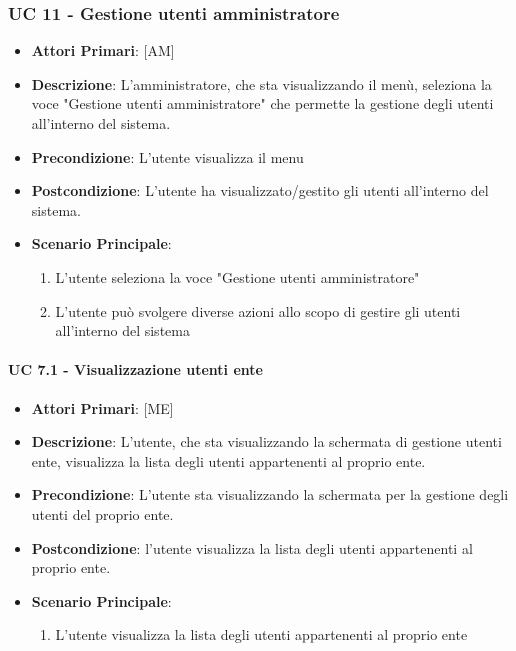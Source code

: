 		\subsubsection{UC 11 - Gestione utenti amministratore}
		\begin{itemize}
			\item \textbf{Attori Primari}: [AM]
			\item \textbf{Descrizione}: L'amministratore, che sta visualizzando il menù, seleziona la voce "Gestione utenti amministratore" che permette la gestione degli utenti all'interno del sistema.
			\item \textbf{Precondizione}: L'utente visualizza il menu
			\item \textbf{Postcondizione}: L'utente ha visualizzato/gestito gli utenti all'interno del sistema. 
			\item \textbf{Scenario Principale}:
			\begin{enumerate}
				\item{L'utente seleziona la voce "Gestione utenti amministratore"}
				\item{L'utente può svolgere diverse azioni allo scopo di gestire gli utenti all'interno del sistema}
			\end{enumerate}	
		\end{itemize}

			\paragraph{UC 7.1 - Visualizzazione utenti ente}
			\begin{itemize}
				\item \textbf{Attori Primari}: [ME]
				\item \textbf{Descrizione}: L'utente, che sta visualizzando la schermata di gestione utenti ente, visualizza la lista degli utenti appartenenti al proprio ente.
				\item \textbf{Precondizione}: L'utente sta visualizzando la schermata per la gestione degli utenti del proprio ente.
				\item \textbf{Postcondizione}: l'utente visualizza la lista degli utenti appartenenti al proprio ente.
				\item \textbf{Scenario Principale}:
				\begin{enumerate}
					\item{L'utente visualizza la lista degli utenti appartenenti al proprio ente}
				\end{enumerate}	
			\end{itemize}
			
